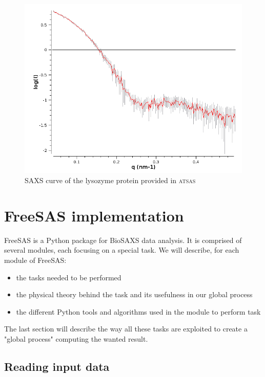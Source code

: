 \documentclass[a4paper, 11pt]{report}
\begin{document}
\begin{figure}
\centering
\includegraphics[scale=0.45]{saxscurve.png}
\caption{SAXS curve of the lysozyme protein provided in \textsc{atsas}}
\label{fgr:saxscurve}
\end{figure}


\chapter{FreeSAS implementation}

FreeSAS is a Python package for BioSAXS data analysis. 
It is comprised of several modules, each focusing on a special task. 
We will describe, for each module of FreeSAS:
\begin{itemize}
 \item the tasks needed to be performed
 \item the physical theory behind the task and its usefulness in our 
       global process
 \item the different Python tools and algorithms used in the module to 
       perform task
\end{itemize}
The last section will describe the way all these tasks are exploited 
to create a "global process" computing the wanted result. 

\section{Reading input data}
\end{document}

